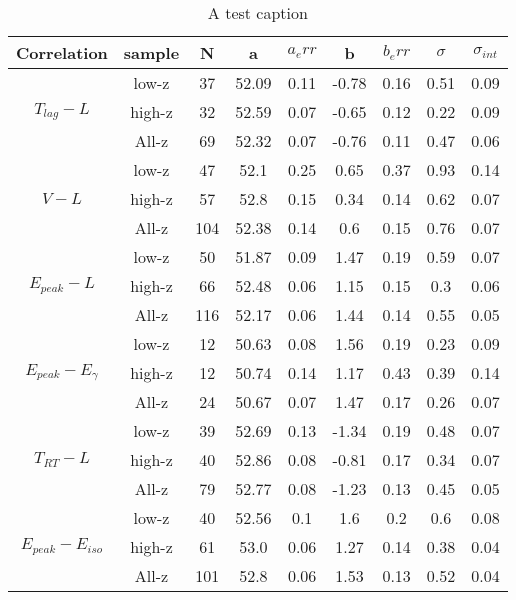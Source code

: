 \begin{table} [H]
\centering
\begin{tabular}{|c|c|c|c|c|c|c|c|c|}
\hline
Correlation & sample & N & a & $a_err$ & b & $b_err$ & $\sigma$ & $\sigma_{int}$\\
\hline
\multirow{3}{*}{$T_{lag}-L$} & low-z & 37 & 52.09 & 0.11 & -0.78 & 0.16 & 0.51 & 0.09\\
\cline{2-9}
 & high-z & 32 & 52.59 & 0.07 & -0.65 & 0.12 & 0.22 & 0.09\\
\cline{2-9}
 & All-z & 69 & 52.32 & 0.07 & -0.76 & 0.11 & 0.47 & 0.06\\
\hline
\multirow{3}{*}{$V-L$} & low-z & 47 & 52.1 & 0.25 & 0.65 & 0.37 & 0.93 & 0.14\\
\cline{2-9}
 & high-z & 57 & 52.8 & 0.15 & 0.34 & 0.14 & 0.62 & 0.07\\
\cline{2-9}
 & All-z & 104 & 52.38 & 0.14 & 0.6 & 0.15 & 0.76 & 0.07\\
\hline
\multirow{3}{*}{$E_{peak}-L$} & low-z & 50 & 51.87 & 0.09 & 1.47 & 0.19 & 0.59 & 0.07\\
\cline{2-9}
 & high-z & 66 & 52.48 & 0.06 & 1.15 & 0.15 & 0.3 & 0.06\\
\cline{2-9}
 & All-z & 116 & 52.17 & 0.06 & 1.44 & 0.14 & 0.55 & 0.05\\
\hline
\multirow{3}{*}{$E_{peak}-E_{\gamma}$} & low-z & 12 & 50.63 & 0.08 & 1.56 & 0.19 & 0.23 & 0.09\\
\cline{2-9}
 & high-z & 12 & 50.74 & 0.14 & 1.17 & 0.43 & 0.39 & 0.14\\
\cline{2-9}
 & All-z & 24 & 50.67 & 0.07 & 1.47 & 0.17 & 0.26 & 0.07\\
\hline
\multirow{3}{*}{$T_{RT}-L$} & low-z & 39 & 52.69 & 0.13 & -1.34 & 0.19 & 0.48 & 0.07\\
\cline{2-9}
 & high-z & 40 & 52.86 & 0.08 & -0.81 & 0.17 & 0.34 & 0.07\\
\cline{2-9}
 & All-z & 79 & 52.77 & 0.08 & -1.23 & 0.13 & 0.45 & 0.05\\
\hline
\multirow{3}{*}{$E_{peak}-E_{iso}$} & low-z & 40 & 52.56 & 0.1 & 1.6 & 0.2 & 0.6 & 0.08\\
\cline{2-9}
 & high-z & 61 & 53.0 & 0.06 & 1.27 & 0.14 & 0.38 & 0.04\\
\cline{2-9}
 & All-z & 101 & 52.8 & 0.06 & 1.53 & 0.13 & 0.52 & 0.04\\
\hline
\end{tabular}
\caption{A test caption}
\label{table_pantheon_gp}
\end{table}

